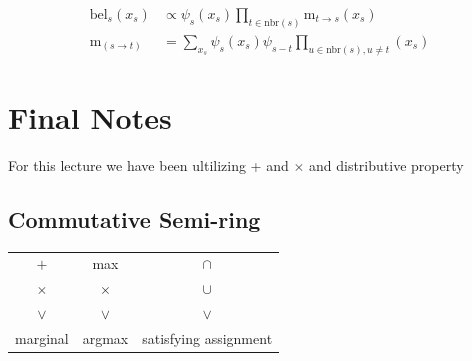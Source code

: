 \documentclass{article}
\newcommand{\bel}{\text{bel}}
\newcommand{\m}{\text{m}}
\newcommand{\nbr}{\text{nbr}}
\begin{document}
\begin{align*}
\bel_s(x_s)&\propto\psi_s(x_s)\prod_{t \in \nbr(s)} \m_{t\rightarrow s}(x_s)\\
\m_(s\rightarrow t) &=\sum_{x_s}\psi_s(x_s)\psi_{s-t}\prod_{u \in \nbr(s), u \neq t}(x_s)
\end{align*}
\section{Final Notes}
For this lecture we have been ultilizing + and $\times$ and distributive property
\subsection{Commutative Semi-ring}
\begin{center}
\begin{tabular}{ c c c }
$+$ & max & $\cap$\\ 
 $\times$ & $\times$& $\cup$ \\  
 $ \vee$&  $ \vee$&  $\vee$\\
 marginal & argmax & satisfying assignment    
\end{tabular}
\end{center}
\end{document}
